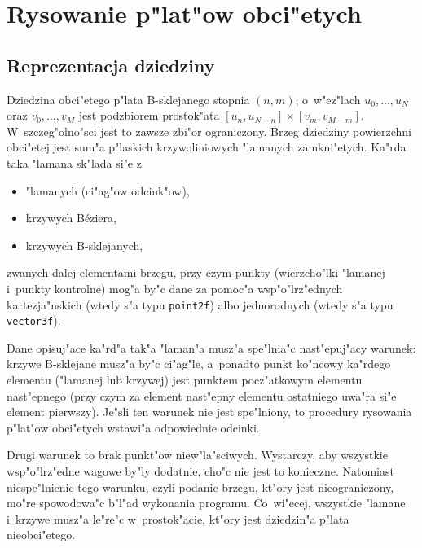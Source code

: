 

\newpage
\section{Rysowanie p"lat"ow obci"etych}

\subsection{\label{ssect:trimpatch:bound}Reprezentacja dziedziny}

Dziedzina obci"etego p"lata B-sklejanego stopnia $(n,m)$, o~w"ez"lach
$u_0,\ldots,u_N$ oraz $v_0,\ldots,v_M$ jest podzbiorem prostok"ata
$[u_n,u_{N-n}]\times[v_m,v_{M-m}]$. W~szczeg"olno"sci jest to zawsze zbi"or
ograniczony.
Brzeg dziedziny powierzchni obci"etej jest sum"a p"laskich krzywoliniowych
"lamanych zamkni"etych. Ka"rda taka "lamana sk"lada si"e z
\begin{itemize}
  \item "lamanych (ci"ag"ow odcink"ow),
  \item krzywych B\'{e}ziera,
  \item krzywych B-sklejanych,
\end{itemize}
zwanych dalej elementami brzegu,
przy czym punkty (wierzcho"lki "lamanej i~punkty kontrolne) mog"a by"c dane
za pomoc"a wsp"o"lrz"ednych kartezja"nskich (wtedy s"a typu
\texttt{point2f}) albo jednorodnych (wtedy s"a typu \texttt{vector3f}).

Dane opisuj"ace ka"rd"a tak"a "laman"a musz"a spe"lnia"c nast"epuj"acy
warunek: krzywe B-sklejane musz"a by"c ci"ag"le, a~ponadto
punkt ko"ncowy ka"rdego elementu ("lamanej lub krzywej) jest
punktem pocz"atkowym elementu nast"epnego (przy czym za element nast"epny
elementu ostatniego uwa"ra si"e element pierwszy). Je"sli ten warunek nie
jest spe"lniony, to procedury rysowania p"lat"ow obci"etych wstawi"a
odpowiednie odcinki.

Drugi warunek to brak punkt"ow niew"la"sciwych. Wystarczy, aby wszystkie
wsp"o"lrz"edne wagowe by"ly dodatnie, cho"c nie jest to konieczne. Natomiast
niespe"lnienie tego warunku, czyli podanie brzegu, kt"ory jest
nieograniczony, mo"re spowodowa"c b"l"ad wykonania programu. Co~wi"ecej,
wszystkie "lamane i~krzywe musz"a le"re"c w~prostok"acie, kt"ory jest
dziedzin"a p"lata nieobci"etego.


